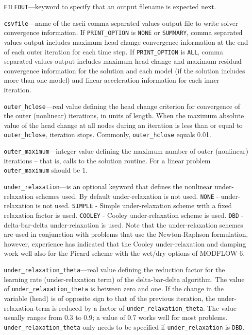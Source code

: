 \item \texttt{FILEOUT}---keyword to specify that an output filename is expected next.

\item \texttt{csvfile}---name of the ascii comma separated values output file to write solver convergence information. If \texttt{PRINT\_OPTION} is \texttt{NONE} or \texttt{SUMMARY}, comma separated values output includes maximum head change convergence information at the end of each outer iteration for each time step. If \texttt{PRINT\_OPTION} is \texttt{ALL}, comma separated values output includes maximum head change and maximum residual convergence information for the solution and each model (if the solution includes more than one model) and linear acceleration information for each inner iteration.

\item \texttt{outer\_hclose}---real value defining the head change criterion for convergence of the outer (nonlinear) iterations, in units of length. When the maximum absolute value of the head change at all nodes during an iteration is less than or equal to \texttt{outer\_hclose}, iteration stops. Commonly, \texttt{outer\_hclose} equals 0.01.

\item \texttt{outer\_maximum}---integer value defining the maximum number of outer (nonlinear) iterations -- that is, calls to the solution routine. For a linear problem \texttt{outer\_maximum} should be 1.

\item \texttt{under\_relaxation}---is an optional keyword that defines the nonlinear under-relaxation schemes used. By default under-relaxation is not used.  \texttt{NONE} - under-relaxation is not used. \texttt{SIMPLE} - Simple under-relaxation scheme with a fixed relaxation factor is used.  \texttt{COOLEY} - Cooley under-relaxation scheme is used.  \texttt{DBD} - delta-bar-delta under-relaxation is used.  Note that the under-relaxation schemes are used in conjunction with problems that use the Newton-Raphson formulation, however, experience has indicated that the Cooley under-relaxation and damping work well also for the Picard scheme with the wet/dry options of MODFLOW 6.

\item \texttt{under\_relaxation\_theta}---real value defining the reduction factor for the learning rate (under-relaxation term) of the delta-bar-delta algorithm. The value of \texttt{under\_relaxation\_theta} is between zero and one. If the change in the variable (head) is of opposite sign to that of the previous iteration, the under-relaxation term is reduced by a factor of \texttt{under\_relaxation\_theta}. The value usually ranges from 0.3 to 0.9; a value of 0.7 works well for most problems. \texttt{under\_relaxation\_theta} only needs to be specified if \texttt{under\_relaxation} is \texttt{DBD}.

